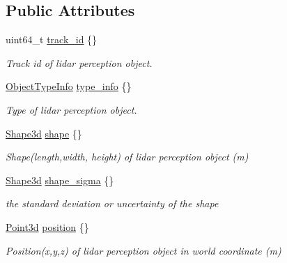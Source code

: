 \subsection*{Public Attributes}
\begin{DoxyCompactItemize}
\item 
uint64\+\_\+t \hyperlink{structmaf__perception__interface_1_1LidarPerceptionObjectData_a63c918c644f861f43a481733b055f3bb}{track\+\_\+id} \{\}
\begin{DoxyCompactList}\small\item\em Track id of lidar perception object. \end{DoxyCompactList}\item 
\hyperlink{structmaf__perception__interface_1_1ObjectTypeInfo}{Object\+Type\+Info} \hyperlink{structmaf__perception__interface_1_1LidarPerceptionObjectData_a40b20909ebfaf5cc90f7beaef8dfb8f6}{type\+\_\+info} \{\}
\begin{DoxyCompactList}\small\item\em Type of lidar perception object. \end{DoxyCompactList}\item 
\hyperlink{structmaf__perception__interface_1_1Shape3d}{Shape3d} \hyperlink{structmaf__perception__interface_1_1LidarPerceptionObjectData_a0d4007e94dc78adf856447aa196a6641}{shape} \{\}
\begin{DoxyCompactList}\small\item\em Shape(length,width, height) of lidar perception object (m) \end{DoxyCompactList}\item 
\hyperlink{structmaf__perception__interface_1_1Shape3d}{Shape3d} \hyperlink{structmaf__perception__interface_1_1LidarPerceptionObjectData_a646fc5eb840ce70b0546ddfa918124d0}{shape\+\_\+sigma} \{\}
\begin{DoxyCompactList}\small\item\em the standard deviation or uncertainty of the shape \end{DoxyCompactList}\item 
\hyperlink{structmaf__perception__interface_1_1Point3d}{Point3d} \hyperlink{structmaf__perception__interface_1_1LidarPerceptionObjectData_a169e06ecc2edc187920fa20735b7d2bb}{position} \{\}
\begin{DoxyCompactList}\small\item\em Position(x,y,z) of lidar perception object in world coordinate (m) \end{DoxyCompactList}\item 

\end{DoxyCompactItemize}
